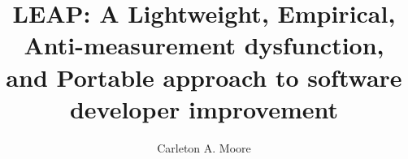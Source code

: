 \documentclass[11pt,times,dissertation,proposal]{uhthesis2e}
\begin{document}
\title{LEAP:  A Lightweight, Empirical, Anti-measurement dysfunction, 
  and Portable approach to software developer improvement}
\author{Carleton A. Moore}
\othermembers{}

\setcounter{tocdepth}{6}
\setcounter{secnumdepth}{10}
\maketitle

\begin{frontmatter}

\signaturepage


%

%

%

\tableofcontents

\listoftables

\listoffigures

\end{frontmatter}
\end{document}
